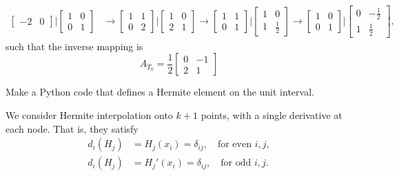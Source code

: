 \begin{solution}
\begin{align*}
\begin{bmatrix}
            -2 & 0
        \end{bmatrix} \Big\vert
        \begin{bmatrix}
            1 & 0 \\
            0 & 1
        \end{bmatrix}
        &\rightarrow
        \begin{bmatrix}
            1 & 1 \\
            0 & 2
        \end{bmatrix} \Big\vert
        \begin{bmatrix}
            1 & 0 \\
            2 & 1
        \end{bmatrix}
        \rightarrow
        \begin{bmatrix}
            1 & 1 \\
            0 & 1
        \end{bmatrix} \Big\vert
        \begin{bmatrix}
            1 & 0 \\
            1 & \frac{1}{2}
        \end{bmatrix}
        \rightarrow
        \begin{bmatrix}
            1 & 0 \\
            0 & 1
        \end{bmatrix} \Big\vert
        \begin{bmatrix}
            0 & -\frac{1}{2} \\
            1 & \frac{1}{2}
        \end{bmatrix},
    \end{align*}
    such that the inverse mapping is
    \begin{equation*}
        A_{T_0} = \frac{1}{2}
        \begin{bmatrix}
            0 & -1 \\
            2 & 1
        \end{bmatrix}
    \end{equation*}
\end{solution}

\begin{exercise}
    Make a Python code that defines a Hermite element on the unit interval.
\end{exercise}

\begin{solution}
    We consider Hermite interpolation onto $k + 1$ points, with a single derivative at each node.
    That is, they satisfy
    \begin{equation}
        \begin{split}
            d_i(H_j) &= H_j(x_i) = \delta_{ij}, \quad \text{for even } i, j, \\
            d_i(H_j) &= H_j'(x_i) = \delta_{ij}, \quad \text{for odd } i, j.
        \end{split}
    \end{equation}
\end{solution}


